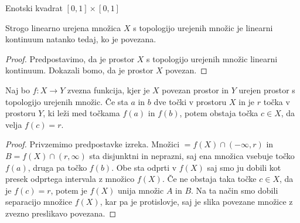 \documentclass[mat2]{fmfdelo}
\begin{document}
\begin{primer}
Enotski kvadrat $[0, 1] \times [0, 1]$ 
\end{primer}

\begin{trditev}
Strogo linearno urejena množica $X$ s topologijo urejenih množic je linearni kontinuum natanko tedaj, ko je povezana.
\end{trditev}
\begin{proof}
Predpostavimo, da je prostor $X$ s topologijo urejenih množic linearni kontinuum. Dokazali bomo, da je prostor $X$ povezan.  
\end{proof}

\begin{izrek}
Naj bo $f : X \to Y$ zvezna funkcija, kjer je $X$ povezan prostor in $Y$ urejen prostor s topologijo urejenih množic. Če sta $a$ in $b$ dve točki v prostoru $X$ in je $r$ točka v prostoru $Y$, ki leži med točkama $f(a)$ in $f(b)$, potem obstaja točka $c \in X$, da velja $f(c) = r$.
\end{izrek}
\begin{proof}
Privzemimo predpostavke izreka. Množici $=f(X) \cap (-\infty, r)$ in $B=f(X) \cap (r, \infty)$ sta disjunktni in neprazni, saj ena množica vsebuje točko $f(a)$, druga pa točko $f(b)$. Obe sta odprti v $f(X)$ saj smo ju dobili kot presek odprtega intervala z množico $f(X)$. Če ne obstaja taka točke $c \in X$, da je $f(c) = r$, potem je $f(X)$ unija množic $A$ in $B$. Na ta način smo dobili separacijo množice $f(X)$, kar pa je protislovje, saj je slika povezane množice z zvezno preslikavo povezana.
\end{proof}
\end{document}
